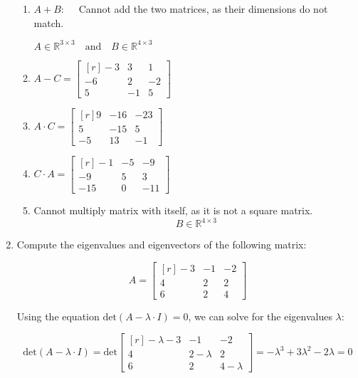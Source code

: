 \documentclass[10pt, oneside, letter]{article}
\begin{document}
\begin{enumerate}
\begin{enumerate}
		\item $A + B: \quad$
		Cannot add the two matrices, as their dimensions do not match.
		\begin{center}
		$A \in \mathbb{R}^{3 \times 3} \quad \mbox{and} \quad B \in \mathbb{R}^{4 \times 3}$
		\end{center}
		
		\item $A - C = 
		\begin{bmatrix*}[r]
		-3 & 3 & 1 \\ -6 & 2 & -2 \\ 5 & -1 & 5
		\end{bmatrix*}$
		
		\item $A \cdot C = 
		\begin{bmatrix*}[r]
		9 & -16 & -23 \\ 5 & -15 & 5 \\ -5 & 13 & -1
		\end{bmatrix*}$
		
		\item $C \cdot A = 
		\begin{bmatrix*}[r]
		-1 & -5 & -9 \\ -9 & 5 & 3 \\ -15 & 0 & -11
		\end{bmatrix*}$
		
		\item Cannot multiply matrix with itself, as it is not a square matrix.
		$$B \in \mathbb{R}^{4 \times 3}$$
		
		\end{enumerate}
	

	
	\item Compute the eigenvalues and eigenvectors of the following matrix:
	
	$$A = \begin{bmatrix*}[r]
	-3 & -1 & -2 \\ 4 & 2 & 2 \\ 6 & 2 & 4
	\end{bmatrix*}$$
	
	Using the equation $\mbox{det}(A - \lambda \cdot I) = 0$, we can solve for the eigenvalues $\lambda$:
	
	$$\mbox{det}(A - \lambda \cdot I) = \mbox{det}\begin{bmatrix*}[r]
	-\lambda-3 & -1 & -2 \\ 4 & 2-\lambda & 2 \\ 6 & 2 & 4-\lambda
	\end{bmatrix*} = -\lambda^3 + 3\lambda^2 - 2\lambda = 0
	$$
	

\end{enumerate}
\end{document}
